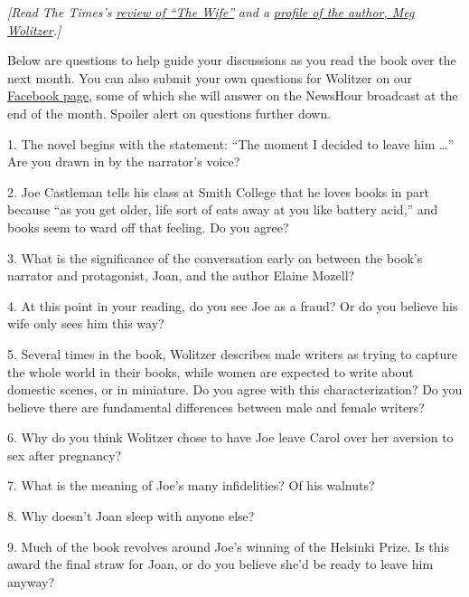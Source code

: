 \emph{{[}Read The Times's}
\href{https://www.nytimes3xbfgragh.onion/2019/01/30/books/februarys-book-club-pick-the-wife-by-meg-wolitzer.html?rref=collection\%2Fspotlightcollection\%2Fnow-read-this\&action=click\&contentCollection=books\&region=rank\&module=package\&version=highlights\&contentPlacement=2\&pgtype=collection}{\emph{review
of ``The Wife''}} \emph{and a}
\href{https://www.nytimes3xbfgragh.onion/2018/03/23/books/meg-wolitzer-the-female-persuasion.html?fbclid=IwAR0BK8hFHgEnMim4rFQm0KknYsH-lrJ9BZbl0j161itrj4BJ5VMg7bbcsas}{\emph{profile
of the author, Meg Wolitzer}}\emph{.{]}}

Below are questions to help guide your discussions as you read the book
over the next month. You can also submit your own questions for Wolitzer
on our
\href{https://www.facebookcorewwwi.onion/groups/NowReadThisBookClub}{Facebook
page}, some of which she will answer on the NewsHour broadcast at the
end of the month. Spoiler alert on questions further down.

1. The novel begins with the statement: ``The moment I decided to leave
him \ldots{}'' Are you drawn in by the narrator's voice?

2. Joe Castleman tells his class at Smith College that he loves books in
part because ``as you get older, life sort of eats away at you like
battery acid,'' and books seem to ward off that feeling. Do you agree?

3. What is the significance of the conversation early on between the
book's narrator and protagonist, Joan, and the author Elaine Mozell?

4. At this point in your reading, do you see Joe as a fraud? Or do you
believe his wife only sees him this way?

5. Several times in the book, Wolitzer describes male writers as trying
to capture the whole world in their books, while women are expected to
write about domestic scenes, or in miniature. Do you agree with this
characterization? Do you believe there are fundamental differences
between male and female writers?

6. Why do you think Wolitzer chose to have Joe leave Carol over her
aversion to sex after pregnancy?

7. What is the meaning of Joe's many infidelities? Of his walnuts?

8. Why doesn't Joan sleep with anyone else?

9. Much of the book revolves around Joe's winning of the Helsinki Prize.
Is this award the final straw for Joan, or do you believe she'd be ready
to leave him anyway?

